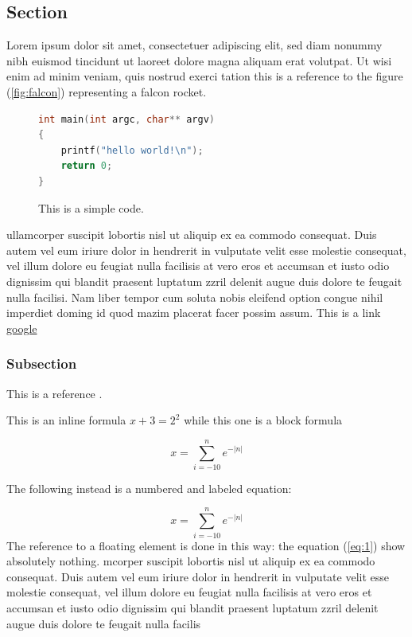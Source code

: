 \documentclass[a4paper,10pt]{article}
\begin{document}
\subsection{Section}

Lorem ipsum
dolor sit amet, consectetuer adipiscing elit, sed diam nonummy nibh euismod tincidunt ut
laoreet dolore magna aliquam erat volutpat. Ut wisi enim ad minim veniam, quis nostrud exerci tation this is a reference to the figure (\ref{fig:falcon}) representing a falcon rocket.

\begin{figure}

\begin{lstlisting}[language=c]
int main(int argc, char** argv)
{
    printf("hello world!\n");
    return 0;
}
\end{lstlisting}

\caption{This is a simple code.}
\end{figure}

ullamcorper suscipit lobortis nisl ut aliquip ex ea commodo consequat. Duis autem vel eum iriure dolor in hendrerit in
vulputate velit esse molestie consequat, vel illum dolore eu feugiat nulla facilisis at vero eros et
accumsan et iusto odio dignissim qui blandit praesent luptatum zzril delenit augue duis dolore te feugait nulla facilisi.
Nam liber tempor cum soluta nobis eleifend option congue nihil imperdiet doming id quod mazim placerat facer possim assum.
This is a link \href{www.google.com"}{google}


\subsubsection{Subsection}

This is a reference .


This is an inline formula \(x+3 = 2^2\) while this one is a block formula


\[
x = \sum_{i=-10}^n e^{-|n|}
\]


The following instead is a numbered and labeled equation:

\begin{equation}
\label{eq:1}
x = \sum_{i=-10}^n e^{-|n|}
\end{equation}
The reference to a floating element is done in this way: the equation (\ref{eq:1}) show absolutely nothing.
mcorper suscipit lobortis nisl ut aliquip ex ea commodo consequat. Duis autem vel eum iriure dolor in hendrerit in
vulputate velit esse molestie consequat, vel illum dolore eu feugiat nulla facilisis at vero eros et
accumsan et iusto odio dignissim qui blandit praesent luptatum zzril delenit augue duis dolore te feugait nulla facilis
\end{document}
